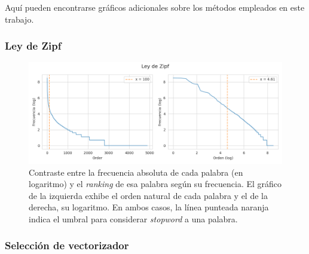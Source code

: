 Aqu\'i pueden encontrarse gr\'aficos adicionales sobre los m\'etodos empleados
en este trabajo.

\subsubsection{Ley de Zipf}
\label{appendix-plots-zipf-law}

\begin{figure}[!htb]
    \centering
    \includegraphics[scale=0.4]{./images/graphs/ley_de_zipf.png}
    \caption{Contraste entre la frecuencia absoluta de cada palabra (en logaritmo)
    y el \textit{ranking} de esa palabra seg\'un su frecuencia. El gr\'afico de la
    izquierda exhibe el orden natural de cada palabra y el de la derecha, su logaritmo.
    En ambos casos, la l\'inea punteada naranja indica el umbral
    para considerar \textit{stopword} a una palabra.}
    \label{fig-zipf-law}
\end{figure}
\FloatBarrier

\subsubsection{Selecci\'on de vectorizador}
\label{appendix-plots-vectorizers}

